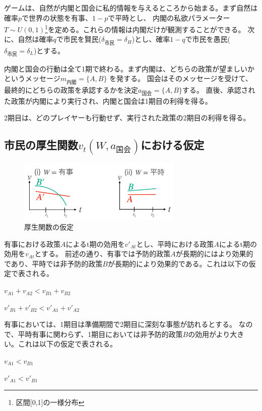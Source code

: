 \documentclass[main.tex]{subfiles}
\begin{document}
ゲームは、自然が内閣と国会に私的情報を与えるところから始まる。まず自然は確率$p$で世界の状態を有事、$1-p$で平時とし、
内閣の私欲パラメーター$T\sim U(0,1)$\footnote{区間[0,1]の一様分布}を定める。これらの情報は内閣だけが観測することができる。
次に、自然は確率$q$で市民を賢民($\delta_{市民}=\delta_H$)とし、確率$1-q$で市民を愚民($\delta_{市民}=\delta_L$)とする。

内閣と国会の行動は全て1期で終わる。まず内閣は、どちらの政策が望ましいかというメッセージ$m_{内閣} = \lbrace A, B \rbrace$ を発する。
国会はそのメッセージを受けて、最終的にどちらの政策を承認するかを決定$a_{国会} = \lbrace A, B\rbrace$する。
直後、承認された政策が内閣により実行され、内閣と国会は1期目の利得を得る。

2期目は、どのプレイヤーも行動せず、実行された政策の2期目の利得を得る。




\subsection{市民の厚生関数$v_t(W, a_{国会})$における仮定}

\begin{figure}[htbp]
  \centering
  \includegraphics[width=0.7\textwidth]{./image/assumption_welfare_policy.png}
  \caption{厚生関数の仮定} 
  \label{fig:assumption_welfare_policy}
\end{figure}

有事における政策$A$によるt期の効用を$v'_{At}$とし、平時における政策$A$によるt期の効用を$v_{At}$とする。
前述の通り、有事では予防的政策$A$が長期的にはより効果的であり、平時では非予防的政策$B$が長期的により効果的である。これは以下の仮定で表される。
\begin{assumption}  $v_{A1} + v_{A2} < v_{B1} + v_{B2}$ \end{assumption}
\begin{assumption}  $v'_{B1} + v'_{B2} < v'_{A1} + v'_{A2}$ \end{assumption}


有事においては、1期目は準備期間で2期目に深刻な事態が訪れるとする。
なので、平時有事に関わらず、1期目においては非予防的政策$B$の効用がより大きい。これは以下の仮定で表される。
\begin{assumption}  $v_{A1} < v_{B1}$  \end{assumption}
\begin{assumption}  $v'_{A1} < v'_{B1}$ \end{assumption}
\end{document}
